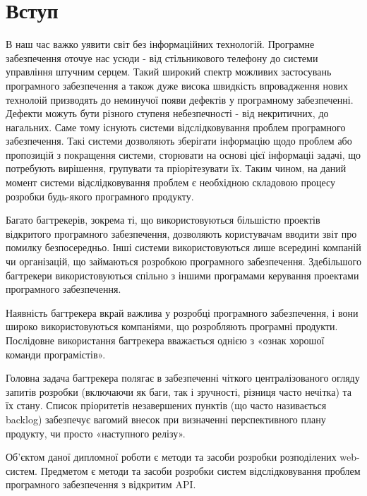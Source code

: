 \documentclass[../main.tex]{subfiles}
\begin{document}
\chapter*{Вступ}

В наш час важко уявити світ без інформаційних технологій. Програмне забезпечення оточуе нас усюди - від стільникового телефону до системи управління штучним серцем. Такий широкий спектр можливих застосувань програмного забезпечення а також дуже висока швидкість впровадження нових технолоій призводять до неминучої появи дефектів у програмному забезпеченні. Дефекти можуть бути різного ступеня небезпечності - від некритичних, до нагальних. Саме тому існують системи відслідковування проблем програмного забезпечення. Такі системи дозволяють зберігати інформацію щодо проблем або пропозицій з покращення системи, сторювати на основі цієї інформаціі задачі, що потребують вирішення, групувати та пріорітезувати їх. Таким чином, на даний момент системи відслідковування проблем є необхідною складовою процесу розробки будь-якого програмного продукту.

Багато багтрекерів, зокрема ті, що використовуються більшістю проектів відкритого програмного забезпечення, дозволяють користувачам вводити звіт про помилку безпосередньо. Інші системи використовуються лише всередині компаній чи організацій, що займаються розробкою програмного забезпечення. Здебільшого багтрекери використовуються спільно з іншими програмами керування проектами програмного забезпечення.

Наявність багтрекера вкрай важлива у розробці програмного забезпечення, і вони широко використовуються компаніями, що розробляють програмні продукти. Послідовне використання багтрекера вважається однією з «ознак хорошої команди програмістів»\cite{painless_bug_tracking}.

Головна задача багтрекера полягає в забезпеченні чіткого централізованого огляду запитів розробки (включаючи як баги, так і зручності, різниця часто нечітка) та їх стану. Список пріоритетів незавершених пунктів (що часто називається backlog) забезпечує вагомий внесок при визначенні перспективного плану продукту, чи просто «наступного релізу».

Об'єктом даної дипломної роботи є методи та засоби розробки розподілених web-систем. Предметом є методи та засоби розробки систем відслідковування проблем програмного забезпечення з відкритим API.
\end{document}
